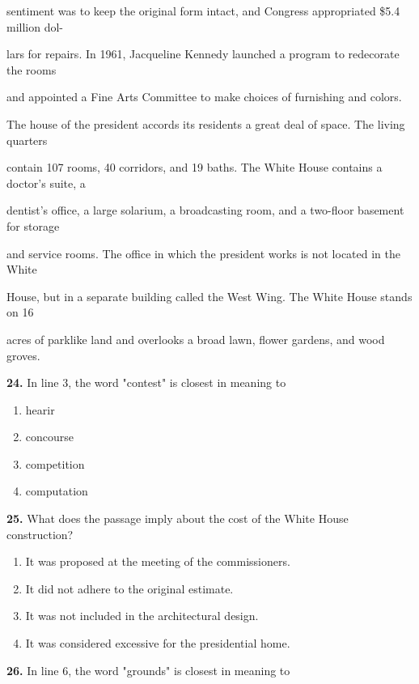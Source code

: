 \documentclass[12pt]{article}
\begin{document}
sentiment was to keep the original form intact, and Congress appropriated \$5.4 million dol-\par
lars for repairs. In 1961, Jacqueline Kennedy launched a program to redecorate the rooms\par
and appointed a Fine Arts Committee to make choices of furnishing and colors.\par
The house of the president accords its residents a great deal of space. The living quarters\par
contain 107 rooms, 40 corridors, and 19 baths. The White House contains a doctor's suite, a\par
dentist's office, a large solarium, a broadcasting room, and a two-floor basement for storage\par
and service rooms. The office in which the president works is not located in the White\par
House, but in a separate building called the West Wing. The White House stands on 16\par
acres of parklike land and overlooks a broad lawn, flower gardens, and wood groves.\par
\endgroup
\medskip
\noindent\textbf{24.} In line 3, the word "contest" is closest in meaning to
\begin{enumerate}[label=(\Alph*),leftmargin=*,itemsep=0.2em]
\item hearir
\item concourse
\item competition
\item computation
\end{enumerate}
\par
\vspace{0.25\baselineskip}
\noindent\textbf{25.} What does the passage imply about the cost of the White House construction?
\begin{enumerate}[label=(\Alph*),leftmargin=*,itemsep=0.2em]
\item It was proposed at the meeting of the commissioners.
\item It did not adhere to the original estimate.
\item It was not included in the architectural design.
\item It was considered excessive for the presidential home.
\end{enumerate}
\par
\vspace{0.25\baselineskip}
\noindent\textbf{26.} In line 6, the word "grounds" is closest in meaning to
\end{document}
